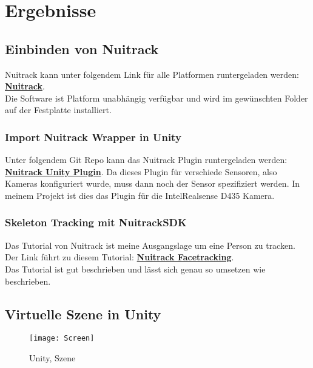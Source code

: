 \section{Ergebnisse}

\subsection{Einbinden von Nuitrack}
Nuitrack kann unter folgendem Link für alle Platformen runtergeladen werden: \href{https://github.com/3DiVi/nuitrack-sdk/blob/master/doc/Install.md}{\textbf{Nuitrack}}. \\ Die Software ist Platform unabhängig verfügbar und wird im gewünschten Folder auf der Festplatte installiert.

\subsubsection{Import Nuitrack Wrapper in Unity}
Unter folgendem Git Repo kann das Nuitrack Plugin runtergeladen werden: \href{https://github.com/3DiVi/nuitrack-sdk/blob/master/Unity3D/NuitrackSDK.unitypackage}{\textbf{Nuitrack Unity Plugin}}. Da dieses Plugin für verschiede Sensoren, also Kameras konfiguriert wurde, muss dann noch der Sensor spezifiziert werden. In meinem Projekt ist dies das Plugin für die IntelRealsense D435 Kamera.


\subsubsection{Skeleton Tracking mit NuitrackSDK}
Das Tutorial von Nuitrack ist meine Ausgangslage um eine Person zu tracken. Der Link führt zu diesem Tutorial: \href{https://github.com/3DiVi/nuitrack-sdk/blob/master/doc/Unity_Face_Tracking.md}{\textbf{Nuitrack Facetracking}}. \\ Das Tutorial ist gut beschrieben und lässt sich genau so umsetzen wie beschrieben.

\subsection{Virtuelle Szene in Unity}

\begin{figure}[H]
	\texttt{[image: Screen]}
	\caption{Unity, Szene}
	\label{fig:Screen}
\end{figure}

